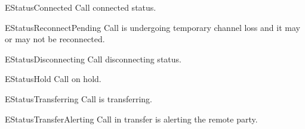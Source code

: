\begin{datadesc}{EStatusConnected}
Call connected status.
\end{datadesc}

\begin{datadesc}{EStatusReconnectPending}
Call is undergoing temporary channel loss and it may or may not be reconnected.
\end{datadesc}

\begin{datadesc}{EStatusDisconnecting}
Call disconnecting status.
\end{datadesc}

\begin{datadesc}{EStatusHold}
Call on hold.
\end{datadesc}

\begin{datadesc}{EStatusTransferring}
Call is transferring.
\end{datadesc}

\begin{datadesc}{EStatusTransferAlerting}
Call in transfer is alerting the remote party.
\end{datadesc}
